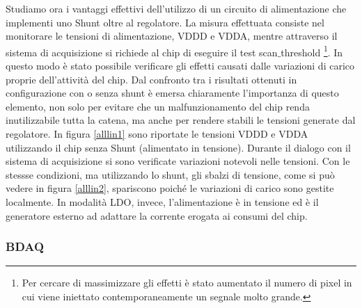 Studiamo ora i vantaggi effettivi dell'utilizzo di un circuito di alimentazione che implementi uno Shunt oltre al regolatore.
La misura effettuata consiste nel monitorare le tensioni di alimentazione, VDDD e VDDA, mentre attraverso il sistema di acquisizione si richiede al chip di eseguire il test scan$\_$threshold
\footnote{
  Per cercare di massimizzare gli effetti è stato aumentato il numero di pixel in cui viene iniettato contemporaneamente un segnale molto grande.
}.
In questo modo è stato possibile verificare gli effetti causati dalle variazioni di carico proprie dell'attività del chip.
Dal confronto tra i risultati ottenuti in configurazione con o senza shunt è emersa chiaramente l'importanza di questo elemento, non solo per evitare che un malfunzionamento del chip renda inutilizzabile tutta la catena, ma anche per rendere stabili le tensioni generate dal regolatore. 
In figura \ref{alllin1} sono riportate le tensioni VDDD e VDDA utilizzando il chip senza Shunt (alimentato in tensione).
Durante il dialogo con il sistema di acquisizione si sono verificate variazioni notevoli nelle tensioni.
Con le stessse condizioni, ma utilizzando lo shunt, gli sbalzi di tensione, come si può vedere in figura \ref{alllin2}, spariscono poiché le variazioni di carico sono gestite localmente.
In modalità LDO, invece, l'alimentazione è in tensione ed è il generatore esterno ad adattare la corrente erogata ai consumi del chip.


\subsubsection{BDAQ}

